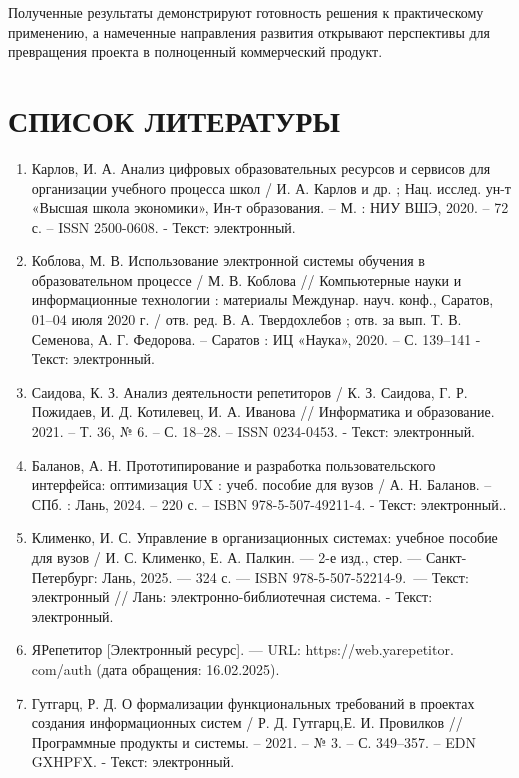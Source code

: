 \documentclass[a4paper,14pt,oneside]{extreport}
\begin{document}
Полученные результаты демонстрируют готовность решения к практическому применению, а намеченные направления развития открывают перспективы для превращения проекта в полноценный коммерческий продукт.

\newpage
\chapter*{СПИСОК ЛИТЕРАТУРЫ}

\begin{enumerate}
    \item Карлов, И. А. Анализ цифровых образовательных ресурсов и сервисов для организации учебного процесса школ / И. А. Карлов и др. ; Нац. исслед. ун-т «Высшая школа экономики», Ин-т образования. – М. : НИУ ВШЭ, 2020. – 72 с. – ISSN 2500-0608. - Текст: электронный.
    \item Коблова, М. В. Использование электронной системы обучения в образовательном процессе / М. В. Коблова // Компьютерные науки и информационные технологии : материалы Междунар. науч. конф., Саратов, 01–04 июля 2020 г. / отв. ред. В. А. Твердохлебов ; отв. за вып. Т. В. Семенова, А. Г. Федорова. – Саратов : ИЦ «Наука», 2020. – С. 139–141  - Текст: электронный.
    \item Саидова, К. З. Анализ деятельности репетиторов / К. З. Саидова, Г. Р. Пожидаев, И. Д. Котилевец, И. А. Иванова // Информатика и образование. 2021. – Т. 36, № 6. – С. 18–28. – ISSN 0234-0453. - Текст: электронный.
    \item Баланов, А. Н. Прототипирование и разработка пользовательского интерфейса: оптимизация UX : учеб. пособие для вузов / А. Н. Баланов. – СПб. : Лань, 2024. – 220 с. – ISBN 978-5-507-49211-4. - Текст: электронный..
    \item  Клименко, И. С. Управление в организационных системах: учебное пособие для вузов / И. С. Клименко, Е. А. Палкин. — 2-е изд., стер. — Санкт-Петербург: Лань, 2025. — 324 с. — ISBN 978-5-507-52214-9. — Текст: электронный // Лань: электронно-библиотечная система. - Текст: электронный. 
    \item  ЯРепетитор [Электронный ресурс]. — URL: https://web.yarepetitor.\\com/auth (дата обращения: 16.02.2025). 
    \item Гутгарц, Р. Д. О формализации функциональных требований в проектах создания информационных систем / Р. Д. Гутгарц,Е. И. Провилков // Программные продукты и системы. – 2021. – № 3. – С. 349–357. – EDN GXHPFX.  - Текст: электронный.

\end{enumerate}
\end{document}
